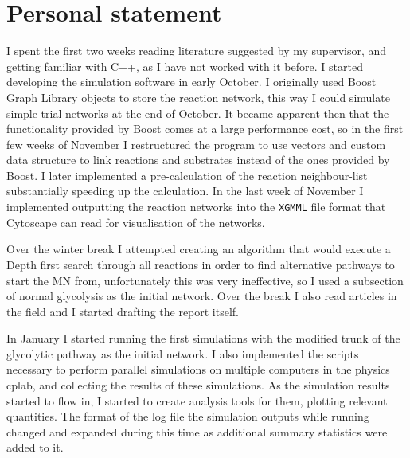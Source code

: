 \documentclass[a4paper,12pt]{article}
\begin{document}
%	
%
%
%
%
%
%


	\newpage
	\section*{Personal statement}
	I spent the first two weeks reading literature suggested by my supervisor, and getting familiar with C++, as I have not worked with it before. 
	I started developing the simulation software in early October. 	I originally used Boost Graph Library objects to store the reaction network, this way I could simulate simple trial networks at the end of October. It became apparent then that the functionality provided by Boost comes at a large performance cost, so in the first few weeks of November I restructured the program to use vectors and custom data structure to link reactions and substrates instead of the ones provided by Boost. I later implemented a pre-calculation of the reaction neighbour-list substantially speeding up the calculation. 
	In the last week of November I implemented outputting the reaction networks into the \texttt{XGMML} file format that Cytoscape can read for visualisation of the networks. 

	Over the winter break I attempted creating an algorithm that would execute a Depth first search through all reactions in order to find alternative pathways to start the MN from, unfortunately this was very ineffective, so I used a subsection of normal glycolysis as the initial network. Over the break I also read articles in the field and I started drafting the report itself. 

	In January I started running the first simulations with the modified trunk of the glycolytic pathway as the initial network. I also implemented the scripts necessary to perform parallel simulations on multiple computers in the physics cplab, and collecting the results of these simulations. 
	As the simulation results started to flow in, I started to create analysis tools for them, plotting relevant quantities. The format of the log file the simulation outputs while running changed and expanded during this time as additional summary statistics were added to it. 
\end{document}
